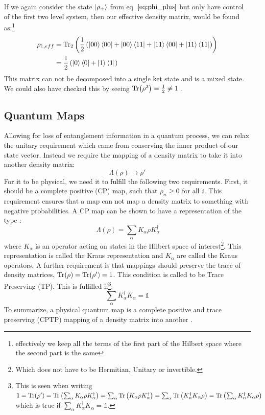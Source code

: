 If we again consider the state $\ket{\rho_+}$ from eq. $\ref{eq:phi_plus}$ but only have control of the first two level system, then our effective density matrix, would be found as:\footnote{effectively we keep all the terms of the first part of the Hilbert space where the second part is the same}
\begin{align}
    \rho_{1, eff}   &= \Tr_2 \left(\frac12 \left(\ket{00}\bra{00} + \ket{00}\bra{11} + \ket{11}\bra{00} + \ket{11}\bra{11} \right) \right) \\
                    &= \frac12 \left(\ket{0}\bra{0} + \ket{1}\bra{1} \right)
\end{align}
This matrix can not be decomposed into a single ket state and is a mixed state. We could also have checked this by seeing $\Tr(\rho^2) = \frac12\neq1$ \cite{manzano_short_2020}. 
 
\subsection{Quantum Maps}
Allowing for loss of entanglement information in a quantum process, we can relax the unitary requirement which came from conserving the inner product of our state vector. Instead we require the mapping of a density matrix to take it into another density matrix:
\begin{equation}
    \Lambda(\rho) \to \rho'
\end{equation}
For it to be physical, we need it to fulfill the following two requirements. First, it should be a complete positive (CP) map, such that $\rho_{ii} \geq 0$ for all $i$. This requirement ensures that a map can not map a density matrix to something with negative probabilities. A CP map can be shown to have a representation of the type \cite{greenbaum_introduction_2015}:
\begin{equation}\
    \Lambda(\rho) = \sum_\alpha K_\alpha\rho K_\alpha^\dagger
\end{equation}
where $K_\alpha$ is an operator acting on states in the Hilbert space of interest\footnote{Which does not have to be Hermitian, Unitary or invertible.}. This representation is called the Kraus representation and $K_\alpha$ are called the Kraus operators. A further requirement is that mappings should preserve the trace of density matrices, $\Tr
(\rho) = \Tr(\rho') = 1$. This condition is called to be Trace Preserving (TP). This is fulfilled if\footnote{This is seen when writing $1 = \Tr(\rho') = \Tr\left(\sum_\alpha K_\alpha\rho K_\alpha^\dagger \right) = \sum_\alpha\Tr\left(K_\alpha\rho K_\alpha^\dagger \right)= \sum_\alpha\Tr\left(K_\alpha^\dagger K_\alpha\rho  \right) = \Tr\left(\sum_\alpha K_\alpha^\dagger K_\alpha\rho  \right)$ which is true if $\sum_\alpha K_\alpha^\dagger K_\alpha = \mathbb{1}$.}:
\begin{equation}
    \sum_\alpha K_\alpha^\dagger K_\alpha = \mathbb{1}
\end{equation}
To summarize, a physical quantum map is a complete positive and trace preserving (CPTP) mapping of a density matrix into another \cite{greenbaum_introduction_2015}.

